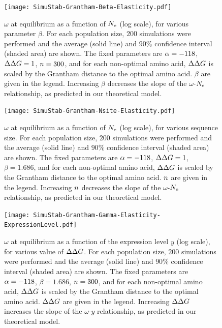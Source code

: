 \begin{figure}[H]
	\centering
	\texttt{[image: SimuStab-Grantham-Beta-Elasticity.pdf]}
	\caption[Effect of $\beta$ on the susceptibility]{
	$\omega$ at equilibrium as a function of $N_{\mathrm{e}}$ (log scale), for various parameter $\beta$.
	For each population size, $200$ simulations were performed and the average (solid line) and $90\%$ confidence interval (shaded area) are shown.
	The fixed parameters are $\alpha=-118$, $\Delta \Delta G=1$, $n=300$, and for each non-optimal amino acid, $\DeltaDeltaG$ is scaled by the Grantham distance to the optimal amino acid. $\beta$ are given in the legend.
	Increasing $\beta$ decreases the slope of the $\omega$-$N_{\mathrm{e}}$ relationship, as predicted in our theoretical model.
	}
\end{figure}

\begin{figure}[H]
	\centering
	\texttt{[image: SimuStab-Grantham-Nsite-Elasticity.pdf]}
	\caption[Effect of sequence size on the susceptibility]{
	$\omega$ at equilibrium as a function of $N_{\mathrm{e}}$ (log scale), for various sequence size.
	For each population size, $200$ simulations were performed and the average (solid line) and $90\%$ confidence interval (shaded area) are shown.
	The fixed parameters are $\alpha=-118$, $\Delta \Delta G=1$, $\beta=1.686$, and for each non-optimal amino acid, $\DeltaDeltaG$ is scaled by the Grantham distance to the optimal amino acid. $n$ are given in the legend.
	Increasing $n$ decreases the slope of the $\omega$-$N_{\mathrm{e}}$ relationship, as predicted in our theoretical model.
	}
\end{figure}

\begin{figure}[H]
	\centering
	\texttt{[image: SimuStab-Grantham-Gamma-Elasticity-ExpressionLevel.pdf]}
	\caption[Effect of $\DeltaDeltaG$ on the susceptibility with regards to expression level]{
	$\omega$ at equilibrium as a function of the expression level $y$ (log scale), for various value of $\DeltaDeltaG$.
	For each population size, $200$ simulations were performed and the average (solid line) and $90\%$ confidence interval (shaded area) are shown.
	The fixed parameters are $\alpha=-118$, $\beta=1.686$, $n=300$, and for each non-optimal amino acid, $\DeltaDeltaG$ is scaled by the Grantham distance to the optimal amino acid. $\DeltaDeltaG$ are given in the legend.
	Increasing $\DeltaDeltaG$ increases the slope of the $\omega$-$y$ relationship, as predicted in our theoretical model.
	}
\end{figure}

